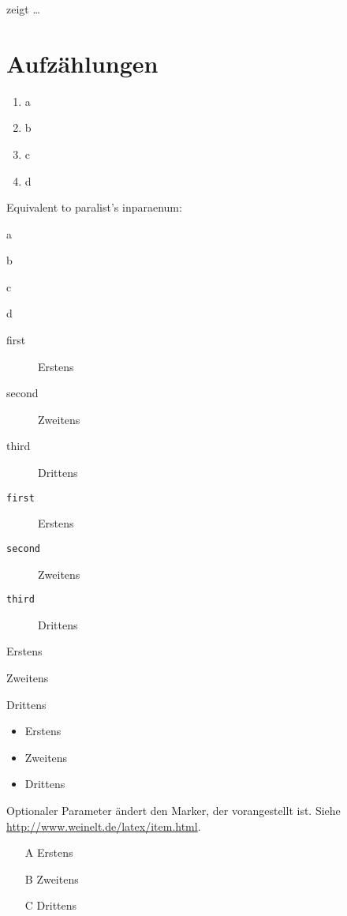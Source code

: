 \documentclass[paper=a5,twoside,fontsize=10pt, DIV=calc, headings=small,bibliography=totoc, listof=totoc]{scrbook}
\begin{document}
 zeigt \ldots


\section{Aufzählungen}
\begin{enumerate}[label=\alph*)]
\item a
\item b
\item c
\item d
\end{enumerate}

Equivalent to paralist's inparaenum:
\begin{enumerate*}[label=\alph*)]
\item a
\item b
\item c
\item d
\end{enumerate*}

\begin{description}
\item[first] Erstens
\item[second] Zweitens
\item[third] Drittens
\end{description}

\begin{description}
\item[\texttt{first}] Erstens
\item[\texttt{second}] Zweitens
\item[\texttt{third}] Drittens
\end{description}

\begin{description}[font=\ttfamily]
\item[first] Erstens
\item[second] Zweitens
\item[third] Drittens
\end{description}

\begin{itemize}
\item Erstens
\item Zweitens
\item Drittens
\end{itemize}

Optionaler Parameter ändert den Marker, der vorangestellt ist. Siehe \url{http://www.weinelt.de/latex/item.html}.
\begin{itemize}
\item[A] Erstens
\item[B] Zweitens
\item[C] Drittens
\end{itemize}
\end{document}
